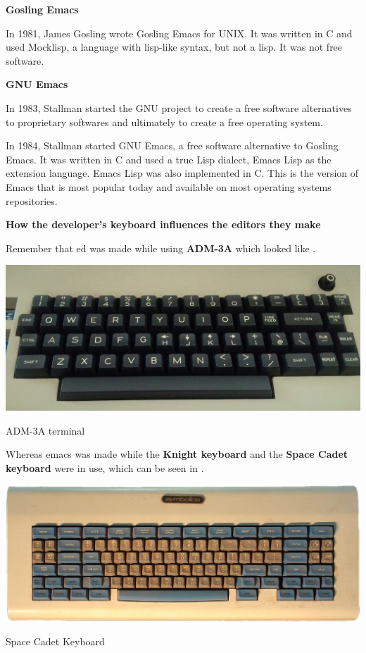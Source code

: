 \textbf{Gosling Emacs}

In 1981, James Gosling wrote Gosling Emacs for UNIX.
It was written in C and used Mocklisp, a language with
lisp-like syntax, but not a lisp. It was not free software.

\textbf{GNU Emacs}

In 1983, Stallman started the GNU project to create a
free software alternatives to proprietary softwares
and ultimately to create a free
operating system.

In 1984, Stallman started GNU Emacs, a free software
alternative to Gosling Emacs. It was written in C and
used a true Lisp dialect, Emacs Lisp as the extension
language. Emacs Lisp was also implemented in C.
This is the version of Emacs that is most popular today
and available on most operating systems repositories.

\textbf{How the developer's keyboard influences the editors they make}

Remember that ed was made while using \textbf{ADM-3A}
which looked like .

\begin{marginfigure}
  \includegraphics{images/png/adm3a-real.png}
  \caption{ADM-3A terminal}
\end{marginfigure}

Whereas emacs was made while the \textbf{Knight keyboard}
and the \textbf{Space Cadet keyboard} were in use, which
can be seen in .

\begin{marginfigure}
  \includegraphics{images/png/space-cadet.png}
  \caption{Space Cadet Keyboard}
\end{marginfigure}

